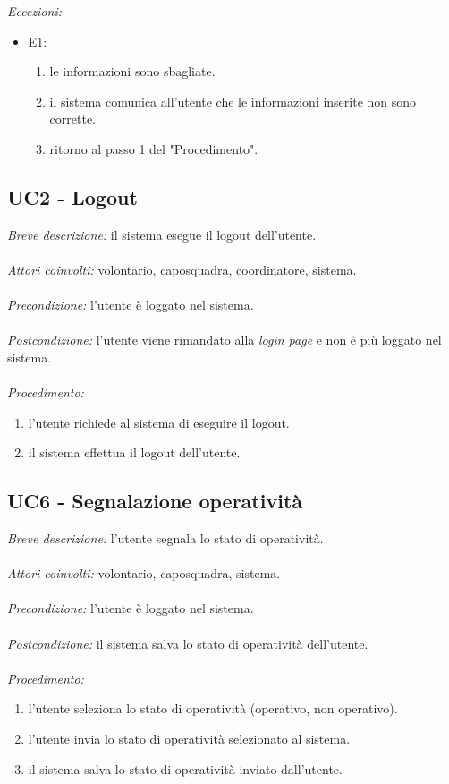 \textit{Eccezioni:}
\begin{itemize}
	\item E1:
	\begin{enumerate}
		\item le informazioni sono sbagliate.
		\item il sistema comunica all'utente che le informazioni inserite non sono corrette.
		\item ritorno al passo 1 del "Procedimento".
	\end{enumerate}
\end{itemize}



\subsection{UC2 - Logout}
\textit{Breve descrizione:} il sistema esegue il logout dell'utente.
\\
\\
\textit{Attori coinvolti:} volontario, caposquadra, coordinatore, sistema.
\\
\\
\textit{Precondizione:} l'utente è loggato nel sistema.
\\
\\
\textit{Postcondizione:} l'utente viene rimandato alla \textit{login page} e non è più loggato nel sistema.
\\
\\
\textit{Procedimento:}
\begin{enumerate}
	\item l'utente richiede al sistema di eseguire il logout.
	\item il sistema effettua il logout dell'utente.
\end{enumerate}

\subsection{UC6 - Segnalazione operatività}
\textit{Breve descrizione:} l'utente segnala lo stato di operatività. 
\\
\\
\textit{Attori coinvolti:} volontario, caposquadra, sistema.
\\
\\
\textit{Precondizione:} l'utente è loggato nel sistema.
\\
\\
\textit{Postcondizione:} il sistema salva lo stato di operatività dell'utente.
\\
\\
\textit{Procedimento:}
\begin{enumerate}
	\item l'utente seleziona lo stato di operatività (operativo, non operativo).
	\item l'utente invia lo stato di operatività selezionato al sistema.
	\item il sistema salva lo stato di operatività inviato dall'utente.
\end{enumerate}



